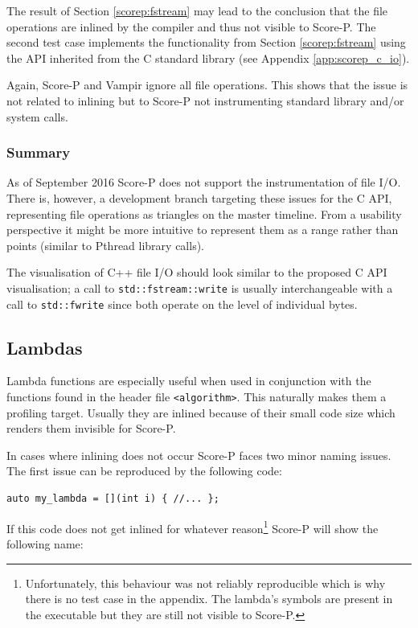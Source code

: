The result of Section \ref{scorep:fstream} may lead to the conclusion that the file operations are inlined by the compiler and thus not visible to Score-P. The second test case implements the functionality from Section \ref{scorep:fstream} using the API inherited from the C standard library (see Appendix \ref{app:scorep_c_io}).

Again, Score-P and Vampir ignore all file operations. This shows that the issue is not related to inlining but to Score-P not instrumenting standard library and/or system calls.

\subsubsection{Summary}

As of September 2016 Score-P does not support the instrumentation of file I/O. There is, however, a development branch targeting these issues for the C API, representing file operations as triangles on the master timeline. From a usability perspective it might be more intuitive to represent them as a range rather than points (similar to Pthread library calls).

The visualisation of C++ file I/O should look similar to the proposed C API visualisation; a call to \texttt{std::fstream::write} is usually interchangeable with a call to \texttt{std::fwrite} since both operate on the level of individual bytes.

\subsection{Lambdas}

Lambda functions are especially useful when used in conjunction with the functions found in the header file \texttt{<algorithm>}. This naturally makes them a profiling target. Usually they are inlined because of their small code size which renders them invisible for Score-P.

In cases where inlining does not occur Score-P faces two minor naming issues. The first issue can be reproduced by the following code:

\begin{verbatim}
auto my_lambda = [](int i) { //... };
\end{verbatim}

\noindent If this code does not get inlined for whatever reason\footnote{Unfortunately, this behaviour was not reliably reproducible which is why there is no test case in the appendix. The lambda's symbols are present in the executable but they are still not visible to Score-P.} Score-P will show the following name:

